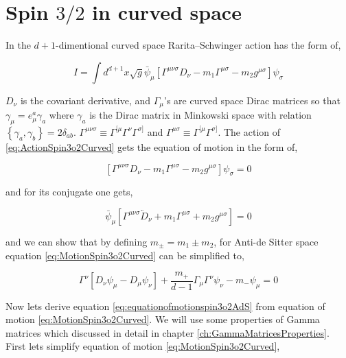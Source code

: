 \section{Spin $3/2$ in curved space}

In the $d+1$-dimentional curved space Rarita–Schwinger action has the form of,

\begin{equation} \label{eq:ActionSpin3o2Curved}
   I = \int d^{d+1}x \sqrt{g} \bar{\psi}_{\mu} \left[\Gamma^{\mu\nu\sigma} D_{\nu} - m_1\Gamma^{\mu\sigma} - m_2 g^{\mu\sigma} \right] \psi_{\sigma}
\end{equation}

$D_{\nu}$ is the covariant derivative, and $\Gamma_{\mu}$'s are curved space Dirac matrices so that $\gamma_{\mu} = e^{a}_{\mu}\gamma_{a}$ where $\gamma_{a}$ is the Dirac matrix in Minkowski space with relation $\left\{\gamma_{a},\gamma_{b}\right\}=2\delta_{ab}$. $\Gamma^{\mu\nu\sigma} \equiv \Gamma^{[\mu}\Gamma^{\nu}\Gamma^{\sigma]}$ and $\Gamma^{\mu\sigma} \equiv \Gamma^{[\mu}\Gamma^{\sigma]}$. The action of \ref{eq:ActionSpin3o2Curved} gets the equation of motion in the form of,

\begin{equation} \label{eq:MotionSpin3o2Curved}
   \left[\Gamma^{\mu\nu\sigma} D_{\nu} - m_1\Gamma^{\mu\sigma} - m_2 g^{\mu\sigma} \right] \psi_{\sigma} = 0
\end{equation}

and for its conjugate one gets,

\begin{equation}
   \bar{\psi}_{\mu} \left[\Gamma^{\mu\nu\sigma} \overleftarrow{D}_{\nu} + m_1\Gamma^{\mu\sigma} + m_2 g^{\mu\sigma} \right] = 0
\end{equation}

and we can show that by defining $m_{\pm} = m_1 \pm m_2$, for Anti-de Sitter space equation \ref{eq:MotionSpin3o2Curved} can be simplified to,

\begin{equation} \label{eq:equationofmotionspin3o2AdS}
   \Gamma^{\nu}\left[D_{\nu}\psi_{\mu} - D_{\mu}\psi_{\nu}\right] + \frac{m_{+}}{d-1}\Gamma_{\mu}\Gamma^{\nu}\psi_{\nu} - m_{-}\psi_{\mu} = 0
\end{equation}

Now lets derive equation \ref{eq:equationofmotionspin3o2AdS} from equation of motion \ref{eq:MotionSpin3o2Curved}. We will use some properties of Gamma matrices which discussed in detail in chapter \ref{ch:GammaMatricesProperties}. First lets simplify equation of motion \ref{eq:MotionSpin3o2Curved},

